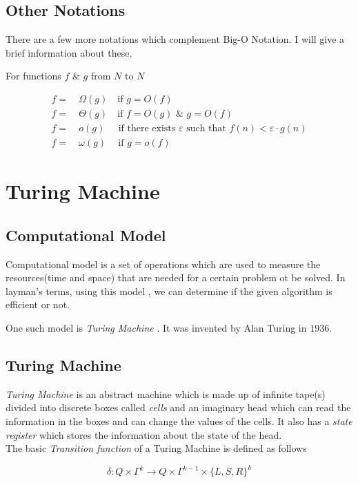 \documentclass[12pt,a4paper]{extarticle}
\begin{document}
\subsection{Other Notations}
There are a few more notations which complement Big-O Notation. I will give a brief information about these.\par
For functions $f$ \& $g$ from $N$ to $N$

\begin{align}
f =&\:\Omega(g)\quad  \textrm{if} \,\,  g=O(f)\\
f =&\:\Theta(g)\quad \textrm{if} \,\,  f=O(g) \,\, \& \,\, g=O(f)\\
f =&\:o(g)\:\,\quad \textrm{if there exists }\varepsilon \textrm{ such that} \,\, f(n)<\varepsilon\cdot g(n) \\
f =&\:\omega(g)\quad \:\textrm{if} \,\,  g=o(f)
\end{align}

\section{Turing Machine}
\subsection{Computational Model}
Computational model is a set of operations which are used to measure the resources(time and space) that are needed for a certain problem ot be solved. In layman's terms, using this model , we can determine if the given algorithm is efficient or not. \par
One such model is \textit{Turing Machine} . It was invented by Alan Turing in $1936$. 
\subsection{Turing Machine}
\textit{Turing Machine} is an abstract machine which is made up of infinite tape(s) divided into discrete boxes called \textit{cells} and an imaginary head which can read the information in the boxes and can change the values of the cells. It also has a \textit{state register} which stores the information about the state of the head.\\
The basic \textit{Transition function} of a Turing Machine is defined as follows

\begin{equation}
\delta:Q\times\Gamma^k\longrightarrow Q\times\Gamma^{k-1}\times\{L,S,R\}^k
\end{equation}  
\end{document}
